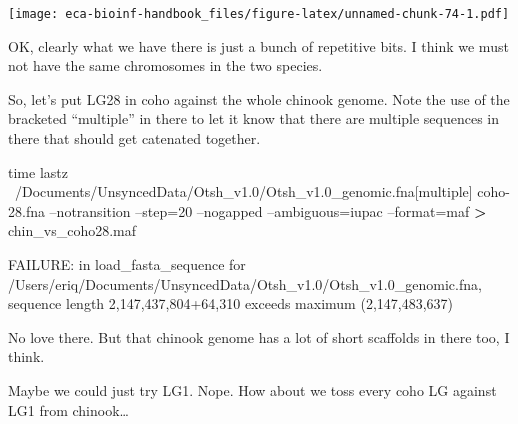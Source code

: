 \documentclass[]{krantz}
\makeatletter
\newenvironment{Shaded}{\begin{snugshade}}{\end{snugshade}}
\newcommand{\BuiltInTok}[1]{#1}
\newcommand{\CommentTok}[1]{\textcolor[rgb]{0.37,0.37,0.37}{\textit{#1}}}
\newcommand{\DataTypeTok}[1]{\textcolor[rgb]{0.27,0.27,0.27}{#1}}
\newcommand{\ExtensionTok}[1]{#1}
\newcommand{\FunctionTok}[1]{\textcolor[rgb]{0,0,0}{#1}}
\newcommand{\KeywordTok}[1]{\textcolor[rgb]{0.27,0.27,0.27}{\textbf{#1}}}
\newcommand{\NormalTok}[1]{#1}
\newcommand{\OperatorTok}[1]{\textcolor[rgb]{0.43,0.43,0.43}{\textbf{#1}}}
\newcommand{\StringTok}[1]{\textcolor[rgb]{0.5,0.5,0.5}{#1}}
\newcommand{\VariableTok}[1]{\textcolor[rgb]{0,0,0}{#1}}
\newenvironment{kframe}{%
\medskip{}
\setlength{\fboxsep}{.8em}
 \def\at@end@of@kframe{}%
 \ifinner\ifhmode%
  \def\at@end@of@kframe{\end{minipage}}%
  \begin{minipage}{\columnwidth}%
 \fi\fi%
 \def\FrameCommand##1{\hskip\@totalleftmargin \hskip-\fboxsep
 \colorbox{shadecolor}{##1}\hskip-\fboxsep
     \hskip-\linewidth \hskip-\@totalleftmargin \hskip\columnwidth}%
 \MakeFramed {\advance\hsize-\width
   \@totalleftmargin\z@ \linewidth\hsize
   \@setminipage}}%
 {\par\unskip\endMakeFramed%
 \at@end@of@kframe}
\renewenvironment{Shaded}{\begin{kframe}}{\end{kframe}}
\makeatother
\begin{document}
\texttt{[image: eca-bioinf-handbook\_files/figure-latex/unnamed-chunk-74-1.pdf]}

OK, clearly what we have there is just a bunch of repetitive bits. I think we must not have the same chromosomes in the two species.

So, let's put LG28 in coho against the whole chinook genome. Note the use of the
bracketed ``multiple'' in there to let it know that there are multiple sequences in there
that should get catenated together.

\begin{Shaded}
\begin{Highlighting}[]
\BuiltInTok{time}\NormalTok{ lastz ~/Documents/UnsyncedData/Otsh_v1.0/Otsh_v1.0_genomic.fna[multiple]  coho-28.fna --notransition --step=20 --nogapped --ambiguous=iupac --format=maf }\OperatorTok{>}\NormalTok{ chin_vs_coho28.maf}

\ExtensionTok{FAILURE}\NormalTok{: in load_fasta_sequence for /Users/eriq/Documents/UnsyncedData/Otsh_v1.0/Otsh_v1.0_genomic.fna, sequence length 2,147,437,804+64,310 exceeds maximum (2,147,483,637)}
\end{Highlighting}
\end{Shaded}

No love there. But that chinook genome has a lot of short scaffolds in there too, I think.

Maybe we could just try LG1. Nope. How about we toss every coho LG against LG1 from chinook\ldots{}

\begin{Shaded}
\end{Shaded}
\end{document}
